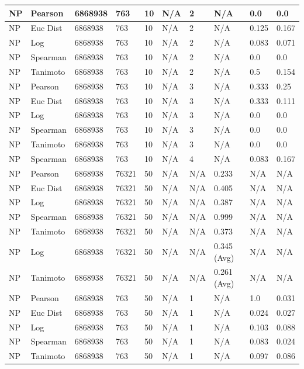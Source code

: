 \documentclass{article}
\begin{document}
\begin{longtable}{ |p{1.7cm}|p{1.9cm}|p{1.5cm}|p{1.5cm}|p{0.75cm}|p{0.75cm}|p{0.75cm}|p{0.75cm}|p{1.5cm}|p{1.5cm}|}
    NP & Pearson & 6868938 & 763 & 10 &  N/A & 2 & N/A & 0.0 & 0.0  \\ \hline
    NP & Euc Dist & 6868938 & 763 & 10 & N/A &  2 & N/A &0.125 & 0.167   \\ \hline
    NP & Log & 6868938 & 763 & 10 &  N/A &  2 & N/A & 0.083 & 0.071 \\ \hline
    NP & Spearman & 6868938 & 763 & 10 & N/A &  2 & N/A & 0.0 & 0.0 \\ \hline
    NP & Tanimoto & 6868938 & 763 & 10 & N/A &  2 & N/A & 0.5 & 0.154 \\ \hline
    
    NP & Pearson & 6868938 & 763 & 10&  N/A & 3 & N/A & 0.333 & 0.25  \\ \hline
    NP & Euc Dist & 6868938 & 763 & 10 & N/A & 3  & N/A &0.333 & 0.111   \\ \hline
    NP & Log & 6868938 & 763 & 10 &  N/A & 3  & N/A & 0.0 & 0.0  \\ \hline
    NP & Spearman & 6868938 & 763 & 10 & N/A & 3  & N/A &0.0 & 0.0 \\ \hline
    NP & Tanimoto & 6868938 & 763 & 10 & N/A & 3 & N/A & 0.0 & 0.0 \\ \hline
    NP & Spearman & 6868938 & 763 & 10 & N/A &  4 & N/A & 0.083 & 0.167 \\ \hline
    
    NP & Pearson & 6868938 & 76321 & 50 &  N/A & N/A & 0.233 & N/A & N/A  \\ \hline
    NP & Euc Dist & 6868938 & 76321 & 50 & N/A & N/A & 0.405 & N/A & N/A   \\ \hline
    NP & Log & 6868938 & 76321 & 50 &  N/A & N/A & 0.387 & N/A & N/A  \\ \hline
    NP & Spearman & 6868938 & 76321 & 50 & N/A & N/A & 0.999 & N/A & N/A \\ \hline
    NP & Tanimoto & 6868938 & 76321 & 50 & N/A & N/A & 0.373 & N/A & N/A \\ \hline
    NP & Log & 6868938 & 76321 & 50 & N/A & N/A & 0.345 (Avg) & N/A & N/A \\ \hline
    NP & Tanimoto & 6868938 & 76321 & 50 & N/A & N/A & 0.261 (Avg) & N/A & N/A \\ \hline
    
    NP & Pearson & 6868938 & 763 & 50 &  N/A & 1 & N/A & 1.0 & 0.031  \\ \hline
    NP & Euc Dist & 6868938 & 763 & 50 & N/A & 1 & N/A &0.024 & 0.027   \\ \hline
    NP & Log & 6868938 & 763 & 50 &  N/A & 1 & N/A & 0.103 & 0.088  \\ \hline
    NP & Spearman & 6868938 & 763 & 50 & N/A & 1 & N/A &0.083 & 0.024 \\ \hline
    NP & Tanimoto & 6868938 & 763 & 50 & N/A & 1 & N/A & 0.097 & 0.086 \\ \hline
    

\end{longtable}
\end{document}
